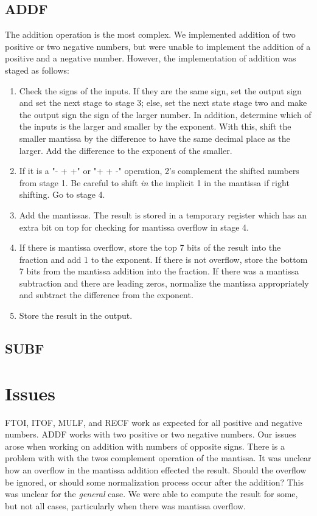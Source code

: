 \documentclass[conference]{IEEEtran}
\begin{document}
    \subsection{ADDF}
        The addition operation is the most complex. We implemented addition of two positive or two negative numbers, but were unable to implement the addition of a positive and a negative number. However, the implementation of addition was staged as follows:
        \begin{enumerate}
            \item Check the signs of the inputs. If they are the same sign, set the output sign and set the next stage to stage 3; else, set the next state stage two and make the output sign the sign of the larger number. In addition, determine which of the inputs is the larger and smaller by the exponent. With this, shift the smaller mantissa by the difference to have the same decimal place as the larger. Add the difference to the exponent of the smaller.
            \item If it is a "- + +" or "+ + -" operation, 2's complement the shifted numbers from stage 1. Be careful to shift \textit{in} the implicit 1 in the mantissa if right shifting. Go to stage 4. 
            \item Add the mantissas. The result is stored in a temporary register which has an extra bit on top for checking for mantissa overflow in stage 4.
            \item If there is mantissa overflow, store the top 7 bits of the result into the fraction and add 1 to the exponent. If there is not overflow, store the bottom 7 bits from the mantissa addition into the fraction. If there was a mantissa subtraction and there are leading zeros, normalize the mantissa appropriately and subtract the difference from the exponent. 
            \item Store the result in the output. 
        \end{enumerate}
    \subsection{SUBF}

\section{Issues}
    FTOI, ITOF, MULF, and RECF work as expected for all positive and negative numbers. ADDF works with two positive or two negative numbers. Our issues arose when working on addition with numbers of opposite signs. There is a problem with with the twos complement operation of the mantissa. It was unclear how an overflow in the mantissa addition effected the result. Should the overflow be ignored, or should some normalization process occur after the addition? This was unclear for the \textit{general} case. We were able to compute the result for some, but not all cases, particularly when there was mantissa overflow. 
\end{document}
